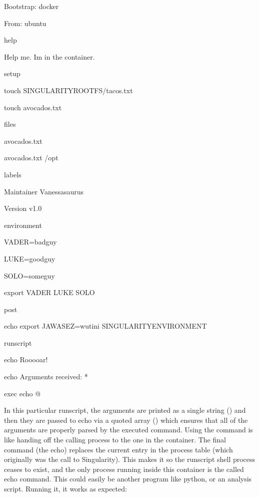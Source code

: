 \documentclass[letterpaper,10pt,english]{sphinxmanual}
\begin{document}
%
\begin{sphinxVerbatim}[commandchars=\\\{\}]
Bootstrap: docker

From: ubuntu


\PYGZpc{}help

Help me. I\PYGZsq{}m in the container.


\PYGZpc{}setup

    touch \PYGZdl{}\PYGZob{}SINGULARITY\PYGZus{}ROOTFS\PYGZcb{}/tacos.txt

    touch avocados.txt


\PYGZpc{}files

    avocados.txt

    avocados.txt /opt


\PYGZpc{}labels

    Maintainer Vanessasaurus

    Version v1.0


\PYGZpc{}environment

    VADER=badguy

    LUKE=goodguy

    SOLO=someguy

    export VADER LUKE SOLO



\PYGZpc{}post

    echo \PYGZsq{}export JAWA\PYGZus{}SEZ=wutini\PYGZsq{} \PYGZgt{}\PYGZgt{} \PYGZdl{}SINGULARITY\PYGZus{}ENVIRONMENT


\PYGZpc{}runscript

    echo \PYGZdq{}Rooooar!\PYGZdq{}

    echo \PYGZdq{}Arguments received: \PYGZdl{}*\PYGZdq{}

    exec echo \PYGZdq{}\PYGZdl{}@\PYGZdq{}
\end{sphinxVerbatim}

In this particular runscript, the arguments are printed as a single
string (\sphinxcode{\sphinxupquote{\$*}}) and then they are passed to echo via a quoted array () which
ensures that all of the arguments are properly parsed by the executed
command. Using the  command is like handing off the calling process to
the one in the container. The final command (the echo) replaces the
current entry in the process table (which originally was the call to
Singularity). This makes it so the runscript shell process ceases to
exist, and the only process running inside this container is the called
echo command. This could easily be another program like python, or an
analysis script. Running it, it works as expected:
\end{document}
